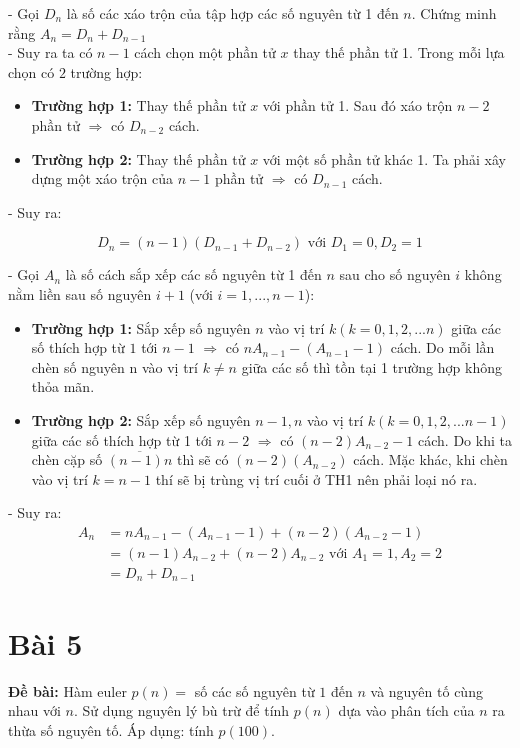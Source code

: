 \documentclass[12pt]{article}
\begin{document}
\begin{sloppypar}
- Gọi \(D_{n}\) là số các xáo trộn của tập hợp các số nguyên từ 1 đến \(n\). Chứng minh rằng \(A_{n}= D_{n} + D_{n-1}\) \\
- Suy ra ta có \(n-1\) cách chọn một phần tử \(x\) thay thế phần tử 1. Trong mỗi lựa chọn có \(2\) trường hợp:

\begin{itemize}
    \item \textbf{Trường hợp 1:} Thay thế phần tử \(x\) với phần tử 1. Sau đó xáo trộn \(n-2\) phần tử \(\Rightarrow\) có \(D_{n-2}\) cách. 
    \item \textbf{Trường hợp 2:} Thay thế phần tử \(x\) với một số phần tử khác 1. Ta phải xây dựng một xáo trộn của \(n-1\) phần tử \(\Rightarrow\) có \(D_{n-1}\) cách.
\end{itemize}
- Suy ra:

\begin{equation*}
    D_{n} = (n-1)(D_{n-1} + D_{n-2}) \text{ với } D_{1} = 0, D_{2} = 1
\end{equation*}

- Gọi \(A_{n}\) là số cách sắp xếp các số nguyên từ 1 đến \(n\) sau cho số nguyên \(i\) không nằm liền sau số nguyên \(i+1\) 
(với \(i=1,...,n-1\)): \\

\begin{itemize}
    \item \textbf{Trường hợp 1:} Sắp xếp số nguyên \(n\) vào vị trí \(k (k = 0,1,2,...n)\) giữa các số thích hợp từ \(1\) tới \(n-1\) \(\Rightarrow\) có \(nA_{n-1}-(A_{n-1}-1)\) cách. Do mỗi lần chèn số nguyên n vào vị trí \(k \neq n\) giữa các số thì tồn tại 1 trường hợp không thỏa mãn.
    \item \textbf{Trường hợp 2:} Sắp xếp số nguyên \(n-1,n\) vào vị trí \(k(k=0,1,2,...n-1)\) giữa các số thích hợp từ 1 tới \(n-2\) \(\Rightarrow\) có \((n-2)A_{n-2}-1\) cách. Do khi ta chèn cặp số \(\overline{(n-1)n}\) thì sẽ có \((n-2)(A_{n-2})\) cách. Mặc khác, khi chèn vào vị trí \(k=n-1\) thí sẽ bị trùng vị trí cuối ở TH1 nên phải loại nó ra.
\end{itemize}
- Suy ra:
\begin{align*}
    A_{n}   & = nA_{n-1} - (A_{n-1} - 1) + (n-2)(A_{n-2}-1) \\
            & = (n-1)A_{n-2} + (n-2)A_{n-2} \text{ với } A_{1} = 1, A_{2} = 2 \\
            & = D_{n} + D_{n-1}
\end{align*}


\section{Bài 5}
\begin{tcolorbox}
    \textbf{Đề bài:} Hàm euler \(p(n)=\) số các số nguyên từ \(1\) đến \(n\) và nguyên tố cùng nhau với \(n\). Sử dụng nguyên lý bù trừ để tính \(p(n)\) dựa vào phân tích của \(n\) ra thừa số nguyên tố. Áp dụng: tính \(p(100)\).
\end{tcolorbox}


\end{sloppypar}
\end{document}

